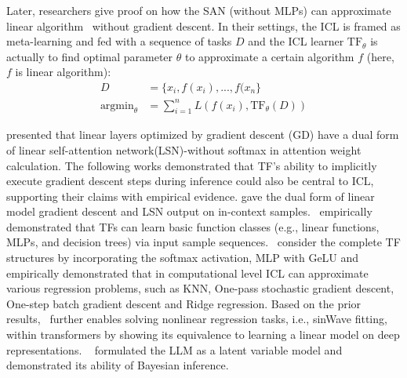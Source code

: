 Later, researchers give proof on how the SAN (without MLPs) can approximate linear algorithm~\cite{dai2023can,DBLP:conf/nips/0001TLV22,DBLP:conf/iclr/AkyurekSA0Z23} without gradient descent. In their settings, the ICL is framed as meta-learning and fed with a sequence of tasks $D$ and the ICL learner $\text{TF}_{\theta}$ is actually to find optimal parameter $\theta$ to approximate a certain algorithm $f$ (here, $f$ is linear algorithm): 
\begin{align*}
   D &=  \{x_i,f(x_{i}),...,f(x_{n}\}\\
\text{argmin}_{\theta} &= \sum_{i=1}^{n} L(f(x_{i}),\text{TF}_{\theta}(D))
\end{align*}



\citet{irie2022dual} presented that linear
layers optimized by gradient descent (GD) have a dual
form of linear self-attention network(LSN)-without softmax in attention weight calculation. The following works demonstrated that TF’s ability to implicitly execute gradient descent steps during inference could also be central to ICL, supporting their claims with empirical evidence. \citet{dai2023can} gave the dual form of linear model gradient descent and LSN output on in-context samples.~\citet{DBLP:conf/nips/0001TLV22} empirically demonstrated that TFs can learn basic function classes (e.g., linear functions, MLPs, and decision trees) via input
sample sequences.~\citet{DBLP:conf/iclr/AkyurekSA0Z23} consider the complete TF structures by incorporating the softmax activation, MLP with GeLU and empirically demonstrated that in computational level ICL can approximate various regression problems, such as KNN, One-pass stochastic gradient descent, One-step batch gradient descent and Ridge regression. Based on the prior results,~\citet{von2023transformers} further enables solving nonlinear regression tasks, i.e., sinWave fitting, within transformers by showing its equivalence to learning a linear model on deep representations. ~\citet{Xie2021AnEO,swaminathan2023schema,DBLP:journals/corr/abs-2304-09960} formulated the LLM as a latent variable model and demonstrated its ability of Bayesian inference.



